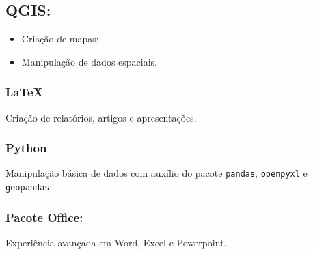 \documentclass[12pt, a4paper]{article}
\begin{document}
\subsection{QGIS:}

\begin{itemize}
   \item Criação de mapas;
   \item Manipulação de dados espaciais.
\end{itemize}

\subsubsection{\LaTeX}

Criação de relatórios, artigos e apresentações.

\subsubsection{Python}

Manipulação básica de dados com auxílio do pacote \verb|pandas|, \verb|openpyxl| e \verb|geopandas|.





\subsubsection{Pacote Office:}

Experiência avançada em Word, Excel e Powerpoint.




\end{document}
